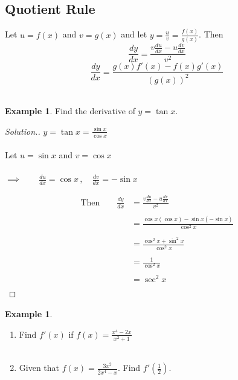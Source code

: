 \documentclass[11pt,a4paper]{article}
\theoremstyle{definition}
\newtheorem{example}[thm]{Example}
\newenvironment{solution}
  {\renewcommand{\qedsymbol}{}\begin{proof}[\textit{Solution}.]}
  {\end{proof}}
\begin{document}
\subsection{Quotient Rule}
Let $u=f(x)$ and $v=g(x)$ and let $y=\frac{u}{v}=\frac{f(x)}{g(x)}$. Then $$\frac{dy}{dx}=\frac{v\frac{du}{dx}-u\frac{dv}{dx}}{v^2}$$
$$\frac{dy}{dx}=\frac{g(x)f'(x)-f(x)g'(x)}{(g(x))^2}$$\\

\begin{example}

Find the derivative of $y=\tan x$.
\end{example}

\begin{solution}
$y=\tan x = \frac{\sin x}{\cos x}$\\\\
Let $u=\sin x$ and $v=\cos x$\\\\
$\implies \qquad  \frac{du}{dx}=\cos x\,,\quad  \frac{dv}{dx}=-\sin x$

\begin{align*}
\text{Then}\qquad   \frac{dy}{dx} &=\frac{v\frac{du}{dx}-u\frac{dv}{dx}}{v^2}\\\\
& =\frac{\cos x (\cos x)-\sin x(-\sin x)}{\cos^2x}\\\\
& = \frac{\cos^2 x+\sin^2 x}{\cos^2x}\\\\
& = \frac{1}{\cos^2x}\\\\
& = \sec^2 x\\
\end{align*}
\end{solution}
\begin{example}

\begin{enumerate}
\item Find $f'(x)$ if $f(x)=\frac{x^4-2x}{x^2+1}$\\\
\item Given that $f(x)=\frac{3x^2}{2x^4-x}$. Find $f'\left(\frac{1}{2}\right)$.
\end{enumerate}
\end{example}
\end{document}
